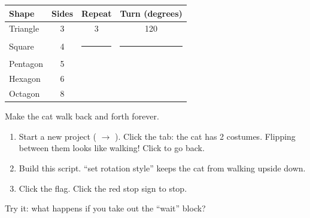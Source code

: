 \begin{center}
\renewcommand{\arraystretch}{1.4}
\begin{tabular}{|l|c|c|c|}
\hline
\textbf{Shape} & \textbf{Sides} & \textbf{Repeat} & \textbf{Turn (degrees)} \\ \hline
Triangle & 3 & 3 & 120 \\ \hline
Square & 4 & \rule{1cm}{0pt} & \rule{1.5cm}{0pt} \\ \hline
Pentagon & 5 & & \\ \hline
Hexagon & 6 & & \\ \hline
Octagon & 8 & & \\ \hline
\end{tabular}
\end{center}

\begin{exercise}
Make the cat walk back and forth forever.
\begin{enumerate}[leftmargin=1.4em,itemsep=1pt]
  \item Start a new project ( $\rightarrow$ ). Click the  tab: the cat has 2 costumes. Flipping between them looks like walking! Click  to go back.
  \item Build this script. \enquote{set rotation style} keeps the cat from walking upside down.
  \item Click the flag. Click the red stop sign to stop.
\end{enumerate}
\begin{center}
\begin{scratch}[scale=0.85]
\end{scratch}
\end{center}
Try it: what happens if you take out the \enquote{wait} block? 
\end{exercise}

